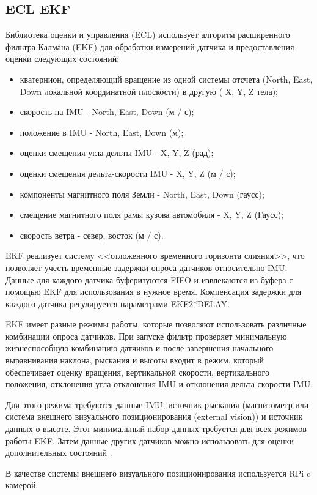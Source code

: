 \subsection{ECL EKF}
Библиотека оценки и управления (ECL) использует алгоритм расширенного фильтра Калмана (EKF) для обработки измерений датчика и предоставления оценки следующих состояний:
\begin{itemize}
	\item кватернион, определяющий вращение из одной системы отсчета (North, East, Down локальной координатной плоскости) в другую ( X, Y, Z тела);
	\item скорость на IMU - North, East, Down (м / с);
	\item положение в IMU - North, East, Down (м);
	\item оценки смещения угла дельты IMU - X, Y, Z (рад);
	\item оценки смещения дельта-скорости IMU - X, Y, Z (м / с);
	\item компоненты магнитного поля Земли - North, East, Down (гаусс);
	\item смещение магнитного поля рамы кузова автомобиля - X, Y, Z (Гаусс);
	\item скорость ветра - север, восток (м / с).
\end{itemize}

EKF реализует систему <<отложенного временного горизонта слияния>>, что позволяет учесть временные задержки опроса датчиков относительно IMU. Данные для каждого датчика буферизуются FIFO и извлекаются из буфера с помощью EKF для использования в нужное время. Компенсация задержки для каждого датчика регулируется параметрами EKF2*DELAY.

EKF имеет разные режимы работы, которые позволяют использовать различные комбинации опроса датчиков. При запуске фильтр проверяет минимальную жизнеспособную комбинацию датчиков и после завершения начального выравнивания наклона, рыскания и высоты входит в режим, который обеспечивает оценку вращения, вертикальной скорости, вертикального положения, отклонения угла отклонения IMU и отклонения дельта-скорости IMU.

Для этого режима требуются данные IMU, источник рыскания (магнитометр или система внешнего визуального позиционирования (external vision)) и источник данных о высоте. Этот минимальный набор данных требуется для всех режимов работы EKF. Затем данные других датчиков можно использовать для оценки дополнительных состояний \cite{px4}.

В качестве системы внешнего визуального позиционирования используется RPi c камерой.

